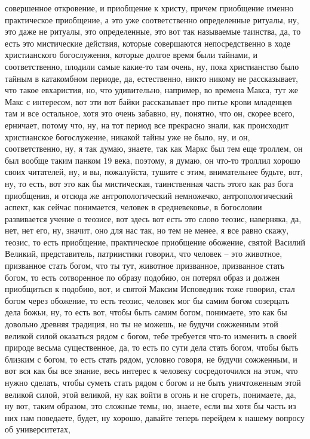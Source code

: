совершенное откровение, и приобщение к христу, причем приобщение именно
практическое приобщение, а это уже соответственно определенные ритуалы, ну, это
даже не ритуалы, это определенные, это вот так называемые таинства, да, то есть
это мистические действия, которые совершаются непосредственно в ходе
христианского богослужения, которые долгое время были тайнами, и соответственно,
плодили самые какие-то там очень, ну, пока христианство было тайным в
катакомбном периоде, да, естественно, никто никому не рассказывает, что такое
евхаристия, но, что удивительно, например, во времена Макса, тут же Макс с
интересом, вот эти вот байки рассказывает про питье крови младенцев там и все
остальное, хотя это очень забавно, ну, понятно, что он, скорее всего, ерничает,
потому что, ну, на тот период все прекрасно знали, как происходит христианское
богослужение, никакой тайны уже не было, ну, и он, соответственно, ну, я так
думаю, знаете, так как Маркс был тем еще троллем, он был вообще таким панком 19
века, поэтому, я думаю, он что-то троллил хорошо своих читателей, ну, и вы,
пожалуйста, тушите с этим, внимательнее будьте, вот, ну, то есть, вот это как бы
мистическая, таинственная часть этого как раз бога приобщения, и отсюда же
антропологический немножечко, антропологический аспект, как сейчас понимается,
человек в средневековье, в богословии развивается учение о теозисе, вот здесь
вот есть это слово теозис, наверняка, да, нет, нет его, ну, значит, оно для нас
так, но тем не менее, я все равно скажу, теозис, то есть приобщение,
практическое приобщение обожение, святой Василий Великий, представитель,
патриистики говорил, что человек – это животное, призванное стать богом, что ты
тут, животное призванное, призванное стать богом, то есть сотворенное по образу
подобию, он потерял образ и должен приобщиться к подобию, вот, и святой Максим
Исповедник тоже говорил, стал богом через обожение, то есть теозис, человек мог
бы самим богом созерцать дела божьи, ну, то есть вот, чтобы быть самим богом,
понимаете, это как бы довольно древняя традиция, но ты не можешь, не будучи
сожженным этой великой силой оказаться рядом с богом, тебе требуется что-то
изменить в своей природе весьма существенное, да, то есть по сути дела стать
богом, чтобы быть близким с богом, то есть стать рядом, условно говоря, не
будучи сожженным, и вот вся как бы все знание, весь интерес к человеку
сосредоточился на этом, что нужно сделать, чтобы суметь стать рядом с богом и не
быть уничтоженным этой великой силой, этой великой, ну как войти в огонь и не
сгореть, понимаете, да, ну вот, таким образом, это сложные темы, но, знаете,
если вы хотя бы часть из них нам поведаете, будет, ну хорошо, давайте теперь
перейдем к нашему вопросу об университетах, 

